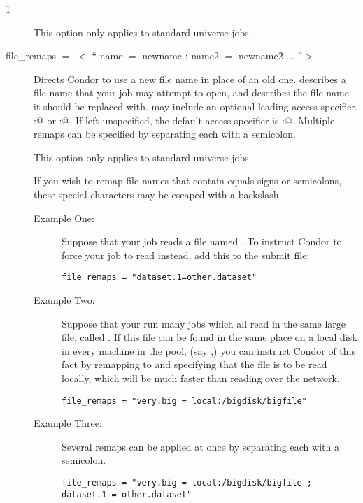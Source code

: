 \begin{ManPage}{\label{man-condor-submit}}{1}
\begin{description}
This option only applies to standard-universe jobs.


\item[file\_remaps $=$ $<$ `` name $=$ newname ; name2 $=$ newname2 ... ''$>$ ]

Directs Condor to use a new file name in place of an old one.  
describes a file name that your job may attempt to open, and 
describes the file name it should be replaced with.
 may include an optional leading
access specifier, \verb@local:@ or \verb@remote:@.  If left unspecified,
the default access specifier is \verb@remote:@.  Multiple remaps can be 
specified by separating each with a semicolon.

This option only applies to standard universe jobs.

If you wish to remap file names that contain equals signs or semicolons,
these special characters may be escaped with a backslash.

\begin{description}
\item[Example One:]
Suppose that your job reads a file named .
To instruct Condor
to force your job to read  instead, 
add this to the submit file:
\begin{verbatim}
file_remaps = "dataset.1=other.dataset"
\end{verbatim}
\item[Example Two:]
Suppose that your run many jobs which all read in the same large file,
called .
If this file can be found in the same place on
a local disk in every machine in the pool,
(say ,) you can
instruct Condor of this fact by remapping  to
 and specifying that the file is to be read locally,
which will be much faster than reading over the network.
\begin{verbatim}
file_remaps = "very.big = local:/bigdisk/bigfile"
\end{verbatim}
\item[Example Three:]
Several remaps can be applied at once by separating each with a semicolon.
\footnotesize
\begin{verbatim}
file_remaps = "very.big = local:/bigdisk/bigfile ; dataset.1 = other.dataset"
\end{verbatim}
\normalsize
\end{description}


\end{description}
\end{ManPage}
